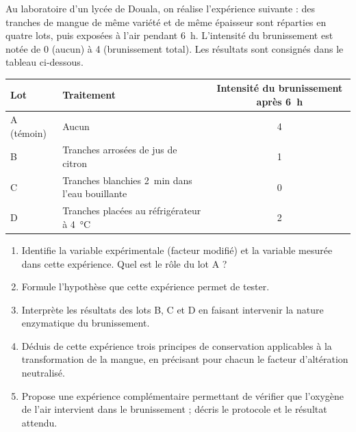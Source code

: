 \documentclass[11pt]{article}
\begin{document}
\begin{exercice}
Au laboratoire d'un lycée de Douala, on réalise l'expérience suivante : des tranches de mangue de même variété et de même épaisseur sont réparties en quatre lots, puis exposées à l'air pendant \SI{6}{h}. L'intensité du brunissement est notée de 0 (aucun) à 4 (brunissement total). Les résultats sont consignés dans le tableau ci-dessous.

\begin{center}
\begin{tabularx}{\linewidth}{|l|X|c|}
\hline
\rowcolor{popblueL} Lot & Traitement & Intensité du brunissement après \SI{6}{h} \\
\hline
A (témoin) & Aucun & 4 \\
\hline
B & Tranches arrosées de jus de citron & 1 \\
\hline
C & Tranches blanchies \SI{2}{min} dans l'eau bouillante & 0 \\
\hline
D & Tranches placées au réfrigérateur à \SI{4}{\celsius} & 2 \\
\hline
\end{tabularx}
\end{center}

\begin{enumerate}
\item Identifie la variable expérimentale (facteur modifié) et la variable mesurée dans cette expérience. Quel est le rôle du lot A ?
\item Formule l'hypothèse que cette expérience permet de tester.
\item Interprète les résultats des lots B, C et D en faisant intervenir la nature enzymatique du brunissement.
\item Déduis de cette expérience trois principes de conservation applicables à la transformation de la mangue, en précisant pour chacun le facteur d'altération neutralisé.
\item Propose une expérience complémentaire permettant de vérifier que l'oxygène de l'air intervient dans le brunissement ; décris le protocole et le résultat attendu.
\end{enumerate}
\end{exercice}
\end{document}
